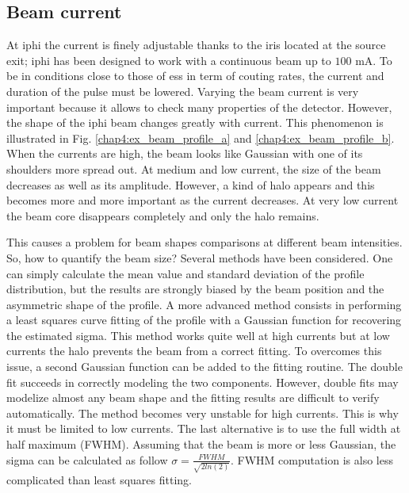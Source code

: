 \begin{refsection}
  \subsection{Beam current}
  \label{chap4:sec:current}
  At \acrshort{iphi} the current is finely adjustable thanks to the iris located at the source exit; \acrshort{iphi} has been designed to work with a continuous beam up to $100$ $\mathrm{mA}$. To be in conditions close to those of \acrshort{ess} in term of couting rates, the current and duration of the pulse must be lowered. Varying the beam current is very important because it allows to check many properties of the detector. However, the shape of the \acrshort{iphi} beam changes greatly with current. This phenomenon is illustrated in Fig. \ref{chap4:ex_beam_profile_a} and \ref{chap4:ex_beam_profile_b}. When the currents are high, the beam looks like Gaussian with one of its shoulders more spread out. At medium and low current, the size of the beam decreases as well as its amplitude. However, a kind of halo appears and this becomes more and more important as the current decreases. At very low current the beam core disappears completely and only the halo remains.

  

  This causes a problem for beam shapes comparisons at different beam intensities. So, how to quantify the beam size? Several methods have been considered. One can simply calculate the mean value and standard deviation of the profile distribution, but the results are strongly biased by the beam position and the asymmetric shape of the profile. A more advanced method consists in performing a least squares curve fitting of the profile with a Gaussian function for recovering the estimated sigma. This method works quite well at high currents but at low currents the halo prevents the beam from a correct fitting. To overcomes this issue, a second Gaussian function can be added to the fitting routine. The double fit succeeds in correctly modeling the two components. However, double fits may modelize almost any beam shape and the fitting results are difficult to verify automatically. The method becomes very unstable for high currents. This is why it must be limited to low currents. The last alternative is to use the full width at half maximum (FWHM). Assuming that the beam is more or less Gaussian, the sigma can be calculated as follow $\sigma = \frac{FWHM}{\sqrt{2ln(2)}}$. FWHM computation is also less complicated than least squares fitting.


\end{refsection}
